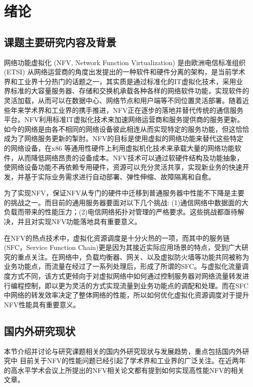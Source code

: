 \chapter{绪论}
\label{chap: Introduction}

\section{课题主要研究内容及背景}
网络功能虚拟化 (NFV, Network Function Virtualization) 是由欧洲电信标准组织 (ETSI) 从网络运营商的角度出发提出的一种软件和硬件分离的架构，是当前学术界和工业界十分热门的话题之一，其实质是通过标准化的IT虚拟化技术，采用业界标准的大容量服务器、存储和交换机承载各种各样的网络软件功能，实现软件的灵活加载，从而可以在数据中心、网络节点和用户端等不同位置灵活部署。随着近些年来学术界和工业界的携手推进，NFV正在逐步的落地并替代传统的通信服务平台。NFV利用标准IT虚拟化技术来加速网络运营商和服务提供商的服务更新。如今的网络是由各不相同的网络设备彼此相连从而实现特定的服务功能，但这恰恰成为了网络服务更新的掣肘。NFV的目标是使用虚拟的网络功能来替代这些特定的网络设备，在x86 等通用性硬件上利用虚拟机化技术来承载大量的网络功能软件，从而降低网络昂贵的设备成本。NFV技术可以通过软硬件结构及功能抽象，使网络设备功能不再依赖专用硬件，资源可以充分灵活共享，实现新业务的快速开发，并基于实际业务需求进行自动部署、弹性伸缩、故障隔离和自愈。

为了实现NFV，保证NFV从专门的硬件中迁移到普通服务器中性能不下降是主要的挑战之一。而目前的通用服务器要面对以下几个挑战\cite{}: (1)通信网络中数据面的大负载而带来的性能压力；(2)电信网络拓扑对管理的严格要求。这些挑战都亟待解决，并且对实现NFV功能落地具有重要意义。

在NFV的热点技术中，虚拟化资源调度是十分火热的一项，而其中的服务链(SFC，Service Function Chain)更是因为其接近实际应用场景的特点，受到广大研究的重点关注\cite{}。在网络中，负载均衡器、网关、以及虚拟防火墙等功能共同被称为业务功能点，而流量在经过了一系列处理后，形成了所谓的SFC。与虚拟化流量调度方式不同，该方式更倾向于对虚拟网络中如何通过控制服务器对网络流量转发进行编程控制，即以更为灵活的方式实现流量到业务功能点的调配和处理。而在SFC中网络的转发效率决定了整体网络的性能，所以如何优化虚拟化资源调度对于提升NFV性能具有重要意义。

\section{国内外研究现状}
本节介绍并讨论与研究课题相关的国内外研究现状与发展趋势，重点包括国内外研究中
目前关于NFV的性能问题已经引起了学术界和工业界的广泛关注。在近两年的高水平学术会议上所提出的NFV相关论文都有提到如何实现高性能NFV的相关文章。

